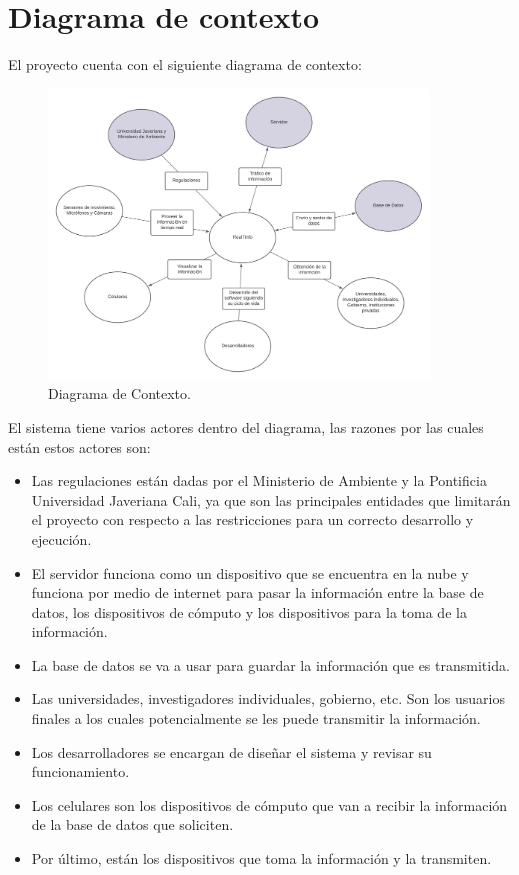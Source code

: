

\section{Diagrama de contexto}

El proyecto cuenta con el siguiente diagrama de contexto:

\begin{figure}[h]
    \centering
    \includegraphics[width=0.90\textwidth]{images/Diagrama de Contexto.png}
    \caption{Diagrama de Contexto.}
    \label{diag_cont}
\end{figure}

El sistema tiene varios actores dentro del diagrama, las razones por las cuales están estos actores son:

\begin{itemize}
    \item Las regulaciones están dadas por el Ministerio de Ambiente y la Pontificia Universidad Javeriana Cali, ya que son las principales entidades que limitarán el proyecto con respecto a las restricciones para un correcto desarrollo y ejecución.
    \item El servidor funciona como un dispositivo que se encuentra en la nube y funciona por medio de internet para pasar la información entre la base de datos, los dispositivos de cómputo y los dispositivos para la toma de la información.
    \item La base de datos se va a usar para guardar la información que es transmitida.
    \item Las universidades, investigadores individuales, gobierno, etc. Son los usuarios finales a los cuales potencialmente se les puede transmitir la información.
    \item Los desarrolladores se encargan de diseñar el sistema y revisar su funcionamiento.
    \item Los celulares son los dispositivos de cómputo que van a recibir la información de la base de datos que soliciten.
    \item Por último, están los dispositivos que toma la información y la transmiten.
\end{itemize}


